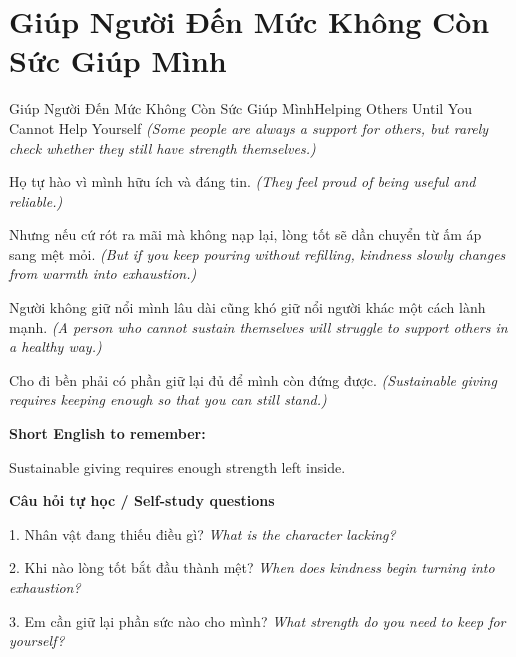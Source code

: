 \section{Giúp Người Đến Mức Không Còn Sức Giúp Mình}
\begin{truyen}{Giúp Người Đến Mức Không Còn Sức Giúp Mình}{Helping Others Until You Cannot Help Yourself}
\textit{(Some people are always a support for others, but rarely check whether they still have strength themselves.)}

Họ tự hào vì mình hữu ích và đáng tin.
\textit{(They feel proud of being useful and reliable.)}

Nhưng nếu cứ rót ra mãi mà không nạp lại, lòng tốt sẽ dần chuyển từ ấm áp sang mệt mỏi.
\textit{(But if you keep pouring without refilling, kindness slowly changes from warmth into exhaustion.)}

Người không giữ nổi mình lâu dài cũng khó giữ nổi người khác một cách lành mạnh.
\textit{(A person who cannot sustain themselves will struggle to support others in a healthy way.)}

\end{truyen}

\begin{baihoc}
Cho đi bền phải có phần giữ lại đủ để mình còn đứng được.
\textit{(Sustainable giving requires keeping enough so that you can still stand.)}
\end{baihoc}

\begin{ghinhoanh}
\textbf{Short English to remember:}

Sustainable giving requires enough strength left inside.

\end{ghinhoanh}

\begin{tuhocnhanh}
\textbf{Câu hỏi tự học / Self-study questions}

1. Nhân vật đang thiếu điều gì? \textit{What is the character lacking?}

2. Khi nào lòng tốt bắt đầu thành mệt? \textit{When does kindness begin turning into exhaustion?}

3. Em cần giữ lại phần sức nào cho mình? \textit{What strength do you need to keep for yourself?}
\end{tuhocnhanh}
\ngancach

